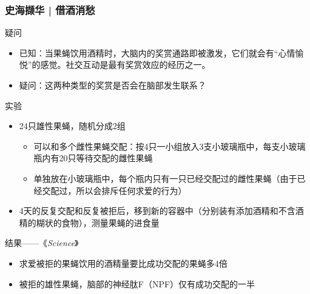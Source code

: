 \begin{frame}
  \frametitle{史海撷华 | 借酒消愁}
  \vspace{-0.5em}
  \begin{block}{疑问}
    \begin{itemize}
      \item 已知：当果蝇饮用酒精时，大脑内的奖赏通路即被激发，它们就会有“心情愉悦”的感觉。社交互动是最有奖赏效应的经历之一。
      \item 疑问：这两种类型的奖赏是否会在脑部发生联系？
  \vspace{-0.2em}
    \end{itemize}
  \end{block}
  \vspace{-0.6em}
  \pause
  \begin{block}{实验}
    \begin{itemize}
      \item 24只雄性果蝇，随机分成2组
        \begin{itemize}
          \item 可以和多个雌性果蝇交配：按4只一小组放入3支小玻璃瓶中，每支小玻璃瓶内有20只等待交配的雌性果蝇
          \item 单独放在小玻璃瓶中，每个瓶内只有一只已经交配过的雌性果蝇（由于已经交配过，所以会排斥任何求爱的行为）
        \end{itemize}
  \vspace{-0.5em}
      \item 4天的反复交配和反复被拒后，移到新的容器中（分别装有添加酒精和不含酒精的糊状的食物），测量果蝇的进食量
  \vspace{-0.2em}
    \end{itemize}
  \end{block}
  \vspace{-0.6em}
  \pause
  \begin{block}{结果——《\textit{Science}》}
    \begin{itemize}
      \item 求爱被拒的果蝇饮用的酒精量要比成功交配的果蝇多4倍
      \item 被拒的雄性果蝇，脑部的神经肽F（NPF）仅有成功交配的一半
  \vspace{-0.2em}
    \end{itemize}
  \end{block}
\end{frame}

